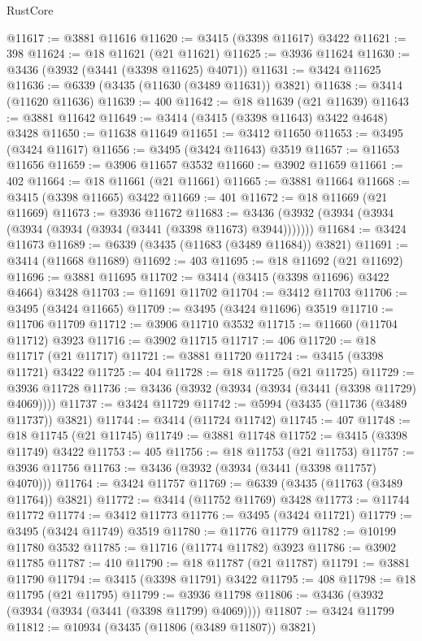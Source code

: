 \begin{lexlean}{RustCore}
\begin{coremodule}
@11617 := @3881 @11616
@11620 := @3415 (@3398 @11617) @3422
@11621 := 398
@11624 := @18 @11621 (@21 @11621)
@11625 := @3936 @11624
@11630 := @3436 (@3932 (@3441 (@3398 @11625) @4071))
@11631 := @3424 @11625
@11636 := @6339 (@3435 (@11630 (@3489 @11631)) @3821)
@11638 := @3414 (@11620 @11636)
@11639 := 400
@11642 := @18 @11639 (@21 @11639)
@11643 := @3881 @11642
@11649 := @3414 (@3415 (@3398 @11643) @3422 @4648) @3428
@11650 := @11638 @11649
@11651 := @3412 @11650
@11653 := @3495 (@3424 @11617)
@11656 := @3495 (@3424 @11643) @3519
@11657 := @11653 @11656
@11659 := @3906 @11657 @3532
@11660 := @3902 @11659
@11661 := 402
@11664 := @18 @11661 (@21 @11661)
@11665 := @3881 @11664
@11668 := @3415 (@3398 @11665) @3422
@11669 := 401
@11672 := @18 @11669 (@21 @11669)
@11673 := @3936 @11672
@11683 := @3436 (@3932 (@3934 (@3934 (@3934 (@3934 (@3934 (@3441 (@3398 @11673) @3944)))))))
@11684 := @3424 @11673
@11689 := @6339 (@3435 (@11683 (@3489 @11684)) @3821)
@11691 := @3414 (@11668 @11689)
@11692 := 403
@11695 := @18 @11692 (@21 @11692)
@11696 := @3881 @11695
@11702 := @3414 (@3415 (@3398 @11696) @3422 @4664) @3428
@11703 := @11691 @11702
@11704 := @3412 @11703
@11706 := @3495 (@3424 @11665)
@11709 := @3495 (@3424 @11696) @3519
@11710 := @11706 @11709
@11712 := @3906 @11710 @3532
@11715 := @11660 (@11704 @11712) @3923
@11716 := @3902 @11715
@11717 := 406
@11720 := @18 @11717 (@21 @11717)
@11721 := @3881 @11720
@11724 := @3415 (@3398 @11721) @3422
@11725 := 404
@11728 := @18 @11725 (@21 @11725)
@11729 := @3936 @11728
@11736 := @3436 (@3932 (@3934 (@3934 (@3441 (@3398 @11729) @4069))))
@11737 := @3424 @11729
@11742 := @5994 (@3435 (@11736 (@3489 @11737)) @3821)
@11744 := @3414 (@11724 @11742)
@11745 := 407
@11748 := @18 @11745 (@21 @11745)
@11749 := @3881 @11748
@11752 := @3415 (@3398 @11749) @3422
@11753 := 405
@11756 := @18 @11753 (@21 @11753)
@11757 := @3936 @11756
@11763 := @3436 (@3932 (@3934 (@3441 (@3398 @11757) @4070)))
@11764 := @3424 @11757
@11769 := @6339 (@3435 (@11763 (@3489 @11764)) @3821)
@11772 := @3414 (@11752 @11769) @3428
@11773 := @11744 @11772
@11774 := @3412 @11773
@11776 := @3495 (@3424 @11721)
@11779 := @3495 (@3424 @11749) @3519
@11780 := @11776 @11779
@11782 := @10199 @11780 @3532
@11785 := @11716 (@11774 @11782) @3923
@11786 := @3902 @11785
@11787 := 410
@11790 := @18 @11787 (@21 @11787)
@11791 := @3881 @11790
@11794 := @3415 (@3398 @11791) @3422
@11795 := 408
@11798 := @18 @11795 (@21 @11795)
@11799 := @3936 @11798
@11806 := @3436 (@3932 (@3934 (@3934 (@3441 (@3398 @11799) @4069))))
@11807 := @3424 @11799
@11812 := @10934 (@3435 (@11806 (@3489 @11807)) @3821)

\end{coremodule}
\end{lexlean}
